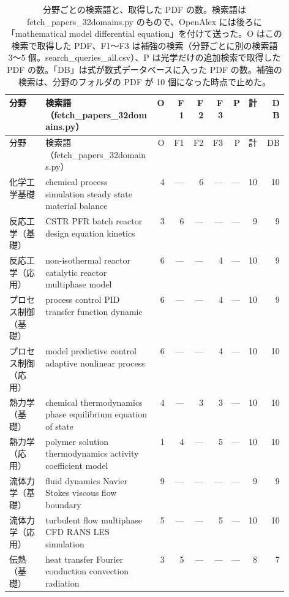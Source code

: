 \begin{footnotesize}
\setlength{\tabcolsep}{3pt}
\begin{longtable}{@{}>{\raggedright\arraybackslash}p{0.13\linewidth}>{\raggedright\arraybackslash}p{0.40\linewidth}rrrrrrr@{}}
\caption{分野ごとの検索語と、取得した PDF の数。検索語は fetch\_papers\_32domains.py のもので、OpenAlex には後ろに「mathematical model differential equation」を付けて送った。O はこの検索で取得した PDF、F1〜F3 は補強の検索（分野ごとに別の検索語 3〜5 個。search\_queries\_all.csv）、P は光学だけの追加検索で取得した PDF の数。「DB」は式が数式データベースに入った PDF の数。補強の検索は、分野のフォルダの PDF が 10 個になった時点で止めた。}\label{tab:search}\\
\toprule
分野 & 検索語（fetch\_papers\_32domains.py） & O & F1 & F2 & F3 & P & 計 & DB \\
\midrule
\endfirsthead
\toprule
分野 & 検索語（fetch\_papers\_32domains.py） & O & F1 & F2 & F3 & P & 計 & DB \\
\midrule
\endhead
\bottomrule
\endlastfoot
化学工学基礎 & chemical process simulation steady state material balance & 4 & --- & 6 & --- & --- & 10 & 10 \\
反応工学（基礎） & CSTR PFR batch reactor design equation kinetics & 3 & 6 & --- & --- & --- & 9 & 9 \\
反応工学（応用） & non-isothermal reactor catalytic reactor multiphase model & 6 & --- & --- & 4 & --- & 10 & 9 \\
プロセス制御（基礎） & process control PID transfer function dynamic & 6 & --- & --- & 4 & --- & 10 & 9 \\
プロセス制御（応用） & model predictive control adaptive nonlinear process & 6 & --- & --- & 4 & --- & 10 & 10 \\
熱力学（基礎） & chemical thermodynamics phase equilibrium equation of state & 4 & --- & 3 & 3 & --- & 10 & 10 \\
熱力学（応用） & polymer solution thermodynamics activity coefficient model & 1 & 4 & --- & 5 & --- & 10 & 10 \\
流体力学（基礎） & fluid dynamics Navier Stokes viscous flow boundary & 9 & --- & --- & --- & --- & 9 & 9 \\
流体力学（応用） & turbulent flow multiphase CFD RANS LES simulation & 5 & --- & --- & 5 & --- & 10 & 10 \\
伝熱（基礎） & heat transfer Fourier conduction convection radiation & 3 & 5 & --- & --- & --- & 8 & 7 \\

\end{longtable}
\end{footnotesize}
